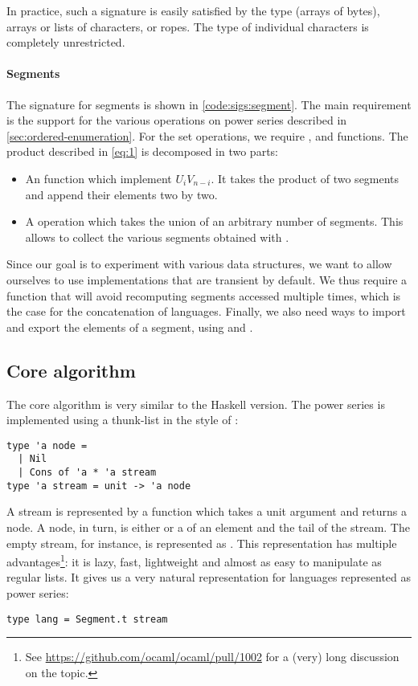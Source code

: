 In practice, such a signature is easily satisfied by the \ocaml {}
type (\ie arrays of bytes), arrays or lists of characters, or ropes. The
type of individual characters is completely unrestricted.

\paragraph{Segments}

The signature for segments is shown in \autoref{code:sigs:segment}.
The main requirement is the support for the various operations on power series described in
\autoref{sec:ordered-enumeration}.
For the set operations, we require
,  and  functions.
%
The product described in \autoref{eq:1} is decomposed in two parts:
\begin{itemize}
\item  An  function which implement $U_i V_{n-i}$. It takes the
  product of two segments and append their elements two by two.
\item A  operation which takes the union of an arbitrary number
  of segments. This allows to collect the various segments obtained
  with .
\end{itemize}
%
Since our goal is to experiment with various data structures, we want to allow
ourselves to use implementations that are transient by default. We thus require
a  function that will avoid recomputing segments accessed multiple times, which is the case for the concatenation of languages.
%
Finally, we also need ways to import and export the elements of a segment, using  and .

\subsection{Core algorithm}

The core algorithm is very similar to the Haskell version. The power series
is implemented using a thunk-list in the style of \citet{DBLP:conf/cpp/Pottier17}:

\begin{lstlisting}
type 'a node =
  | Nil
  | Cons of 'a * 'a stream
type 'a stream = unit -> 'a node
\end{lstlisting}

A stream is represented by a function which takes a unit argument and returns
a node. A node, in turn, is either  or a  of an
element and the tail of the stream. The empty stream, for instance, is
represented as .
This representation has multiple advantages\footnote{See \url{https://github.com/ocaml/ocaml/pull/1002} for a (very) long discussion on the topic.}: it is lazy, fast, lightweight and almost as easy to manipulate as regular lists.
It gives us a very natural representation for languages represented as power series:
\begin{lstlisting}[numbers=none]
type lang = Segment.t stream
\end{lstlisting}

